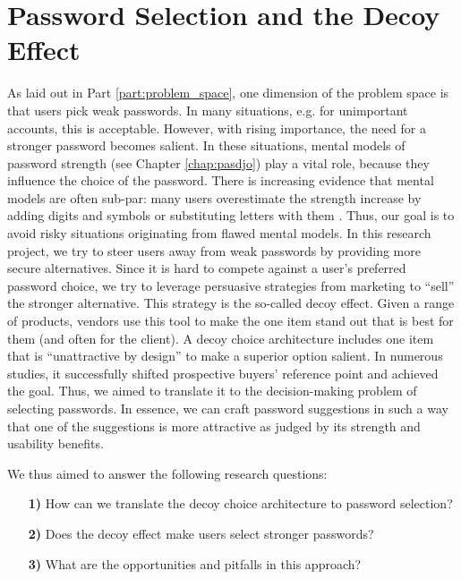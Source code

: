 \chapter[Password Selection and the Decoy Effect]{Password Selection and the Decoy Effect}\label{chap:decoy}
As laid out in Part \ref{part:problem_space}, one dimension of the problem space is that users pick weak passwords. In many situations, e.g. for unimportant accounts, this is acceptable. However, with rising importance, the need for a stronger password becomes salient. In these situations, mental models of password strength (see Chapter \ref{chap:pasdjo}) play a vital role, because they influence the choice of the password. There is increasing evidence that mental models are often sub-par: many users overestimate the strength increase by adding digits and symbols or substituting letters with them \cite{Seitz2017PASDJO, Ur2015PWCreationLab, Ur2016PerceptionsPassword}. Thus, our goal is to avoid risky situations originating from flawed mental models. In this research project, we try to steer users away from weak passwords by providing more secure alternatives. Since it is hard to compete against a user's preferred password choice, we try to leverage persuasive strategies from marketing to ``sell'' the stronger alternative. This strategy is the so-called decoy effect. Given a range of products, vendors use this tool to make the one item stand out that is best for them (and often for the client). A decoy choice architecture includes one item that is ``unattractive by design'' to make a superior option salient. In numerous studies, it successfully shifted prospective buyers' reference point and achieved the goal. Thus, we aimed to translate it to the decision-making problem of selecting passwords. In essence, we can craft password suggestions in such a way that one of the suggestions is more attractive as judged by its strength and usability benefits. 

We thus aimed to answer the following research questions:

\begin{itemize}
	\item[\textbf{1)}] How can we translate the decoy choice architecture to password selection?	
	\item[\textbf{2)}] Does the decoy effect make users select stronger passwords?
	\item[\textbf{3)}] What are the opportunities and pitfalls in this approach?
\end{itemize}
	
